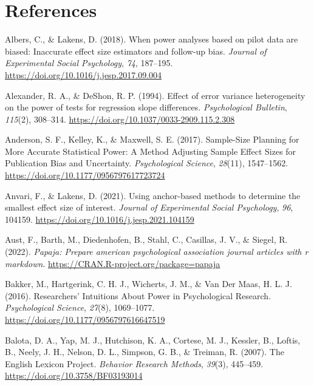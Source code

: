 \documentclass[
  man]{apa7}
\newlength{\cslhangindent}
\newenvironment{CSLReferences}[2] %
 {\begin{list}{}{%
  \setlength{\itemindent}{0pt}
  \setlength{\leftmargin}{0pt}
  \setlength{\parsep}{0pt}
  \ifodd #1
   \setlength{\leftmargin}{\cslhangindent}
   \setlength{\itemindent}{-1\cslhangindent}
  \fi
  \setlength{\itemsep}{#2\baselineskip}}}
 {\end{list}}
\begin{document}
\newpage

\section{References}\label{references}

\begingroup
\setlength{\parindent}{-0.5in}
\setlength{\leftskip}{0.5in}

\label{refs}
\begin{CSLReferences}{1}{0}
Albers, C., \& Lakens, D. (2018). When power analyses based on pilot data are biased: Inaccurate effect size estimators and follow-up bias. \emph{Journal of Experimental Social Psychology}, \emph{74}, 187--195. \url{https://doi.org/10.1016/j.jesp.2017.09.004}

Alexander, R. A., \& DeShon, R. P. (1994). Effect of error variance heterogeneity on the power of tests for regression slope differences. \emph{Psychological Bulletin}, \emph{115}(2), 308--314. \url{https://doi.org/10.1037/0033-2909.115.2.308}

Anderson, S. F., Kelley, K., \& Maxwell, S. E. (2017). Sample-Size Planning for More Accurate Statistical Power: A Method Adjusting Sample Effect Sizes for Publication Bias and Uncertainty. \emph{Psychological Science}, \emph{28}(11), 1547--1562. \url{https://doi.org/10.1177/0956797617723724}

Anvari, F., \& Lakens, D. (2021). Using anchor-based methods to determine the smallest effect size of interest. \emph{Journal of Experimental Social Psychology}, \emph{96}, 104159. \url{https://doi.org/10.1016/j.jesp.2021.104159}

Aust, F., Barth, M., Diedenhofen, B., Stahl, C., Casillas, J. V., \& Siegel, R. (2022). \emph{Papaja: Prepare american psychological association journal articles with r markdown}. \url{https://CRAN.R-project.org/package=papaja}

Bakker, M., Hartgerink, C. H. J., Wicherts, J. M., \& Van Der Maas, H. L. J. (2016). Researchers{'} Intuitions About Power in Psychological Research. \emph{Psychological Science}, \emph{27}(8), 1069--1077. \url{https://doi.org/10.1177/0956797616647519}

Balota, D. A., Yap, M. J., Hutchison, K. A., Cortese, M. J., Kessler, B., Loftis, B., Neely, J. H., Nelson, D. L., Simpson, G. B., \& Treiman, R. (2007). The English Lexicon Project. \emph{Behavior Research Methods}, \emph{39}(3), 445--459. \url{https://doi.org/10.3758/BF03193014}


\end{CSLReferences}
\end{document}
